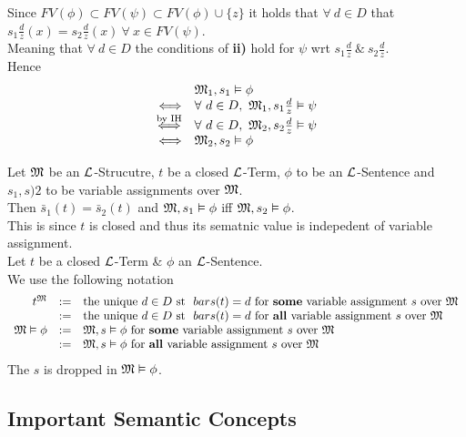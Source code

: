 \documentclass[11pt,a4paper]{article}
\begin{document}
Since $FV(\phi)\subset FV(\psi)\subset FV(\phi)\cup\{z\}$ it holds that $\forall\ d\in D$ that $s_1\frac{d}{z}(x)=s_2\frac{d}{z}(x)\ \forall\ x\in FV(\psi)$.\\
Meaning that $\forall\ d\in D$ the conditions of \textbf{ii)} hold for $\psi$ wrt $s_1\frac{d}{z}\ \&\ s_2\frac{d}{z}$.\\
Hence
\[\begin{array}{rl}
&\M_1,s_1\vDash\phi\\
\Longleftrightarrow&\forall\ d\in D,\ \M_1,s_1\frac{d}{z}\vDash\psi\\
\overset{\text{by IH}}\Longleftrightarrow&\forall\ d\in D,\ \M_2,s_2\frac{d}{z}\vDash\psi\\
\Longleftrightarrow&\M_2,s_2\vDash\phi
\end{array}\]\proved

\theorem{}
Let $\mathfrak{M}$ be an $\mathcal{L}$-Strucutre, $t$ be a closed $\mathcal{L}$-Term, $\phi$ to be an $\mathcal{L}$-Sentence and $s_1,s)2$ to be variable assignments over $\mathfrak{M}$.\\
Then $\bar{s}_1(t)=\bar{s}_2(t)$ and $\mathfrak{M},s_1\vDash\phi$ iff $\mathfrak{M},s_2\vDash\phi$.\\
\nb This is since $t$ is closed and thus its sematnic value is indepedent of variable assignment.\\

\notation{}
Let $t$ be a closed $\mathcal{L}$-Term \& $\phi$ an $\mathcal{L}$-Sentence.\\
We use the following notation
\[\begin{array}{rcl}
t^{\mathfrak{M}}&:=&\text{the unique }d\in D\text{ st }\ bar{s}(t)=d\text{ for \textbf{some} variable assignment }s\text{ over }\mathfrak{M}\\
&:=&\text{the unique }d\in D\text{ st }\ bar{s}(t)=d\text{ for \textbf{all} variable assignment }s\text{ over }\mathfrak{M}\\
\mathfrak{M}\vDash\phi&:=&\mathfrak{M},s\vDash\phi\text{ for \textbf{some} variable assignment }s\text{ over }\mathfrak{M}\\
&:=&\mathfrak{M},s\vDash\phi\text{ for \textbf{all} variable assignment }s\text{ over }\mathfrak{M}\\
\end{array}\]
\nb The $s$ is dropped in $\mathfrak{M}\vDash\phi$.

\subsection{Important Semantic Concepts}

\end{document}
